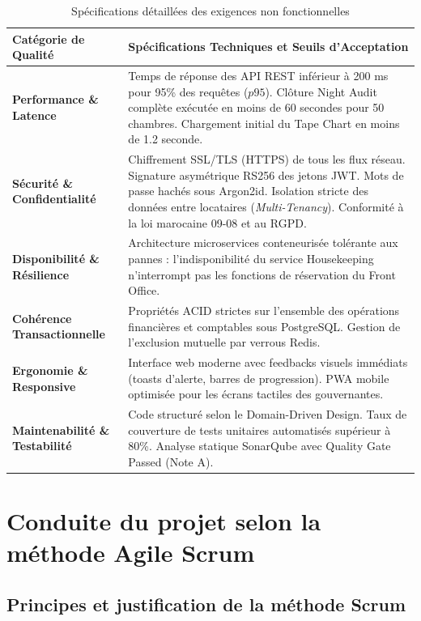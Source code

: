 \begin{table}[H]
\centering
\small
\renewcommand{\arraystretch}{1.3}
\begin{tabularx}{\textwidth}{|p{3.5cm}|X|}
\hline
\textbf{Catégorie de Qualité} & \textbf{Spécifications Techniques et Seuils d'Acceptation} \\
\hline
\textbf{Performance \& Latence} & Temps de réponse des API REST inférieur à 200 ms pour 95\% des requêtes ($p95$). Clôture Night Audit complète exécutée en moins de 60 secondes pour 50 chambres. Chargement initial du Tape Chart en moins de 1.2 seconde. \\
\hline
\textbf{Sécurité \& Confidentialité} & Chiffrement SSL/TLS (HTTPS) de tous les flux réseau. Signature asymétrique RS256 des jetons JWT. Mots de passe hachés sous Argon2id. Isolation stricte des données entre locataires (\textit{Multi-Tenancy}). Conformité à la loi marocaine 09-08 et au RGPD. \\
\hline
\textbf{Disponibilité \& Résilience} & Architecture microservices conteneurisée tolérante aux pannes : l'indisponibilité du service Housekeeping n'interrompt pas les fonctions de réservation du Front Office. \\
\hline
\textbf{Cohérence Transactionnelle} & Propriétés ACID strictes sur l'ensemble des opérations financières et comptables sous PostgreSQL. Gestion de l'exclusion mutuelle par verrous Redis. \\
\hline
\textbf{Ergonomie \& Responsive} & Interface web moderne avec feedbacks visuels immédiats (toasts d'alerte, barres de progression). PWA mobile optimisée pour les écrans tactiles des gouvernantes. \\
\hline
\textbf{Maintenabilité \& Testabilité} & Code structuré selon le Domain-Driven Design. Taux de couverture de tests unitaires automatisés supérieur à 80\%. Analyse statique SonarQube avec Quality Gate Passed (Note A). \\
\hline
\end{tabularx}
\caption{Spécifications détaillées des exigences non fonctionnelles}
\label{tab:besoins_nf_detail}
\end{table}

\section{Conduite du projet selon la méthode Agile Scrum}

\subsection{Principes et justification de la méthode Scrum}

